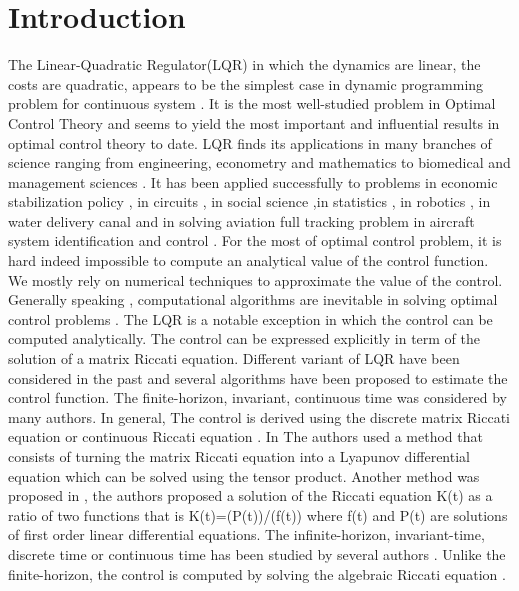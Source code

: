 \documentclass[12pt]{article}
\begin{document}
\section{\huge Introduction}
The Linear-Quadratic Regulator(LQR) in which the dynamics are linear, the costs are quadratic, appears to be the simplest case in dynamic programming problem for continuous system \cite{Bertsekas1}\cite{Todorov} \cite{Bellman}.  It is the most well-studied problem in Optimal Control Theory and  seems to yield   the most important  and influential  results in optimal control theory to date. 
LQR finds its applications in many branches of science ranging from engineering, econometry \cite{MAHMOUD} and mathematics   to biomedical \cite{Irma} and management sciences \cite{Tung}. It has been applied successfully  to problems  in economic stabilization policy \cite{Pindyck}, in  circuits \cite{Rajakumar}, in social science \cite{Cole},in  statistics \cite{Izumi}, in robotics \cite{Sairoel}  , in water delivery canal  \cite{Lemo} and in solving aviation full tracking problem in aircraft system identification and control \cite{Dul} .
For the most of   optimal control problem, it is hard  indeed impossible   to compute an analytical value of the control function. We mostly rely on numerical techniques to approximate the value of the control. Generally speaking , computational algorithms are inevitable in solving optimal control problems . 
 The   LQR  is a notable exception  in which the control  can be computed  analytically. The control can be expressed explicitly  in   term  of the solution of a matrix Riccati equation. 
Different variant of LQR have been considered in the past and several algorithms have been proposed to estimate the control function.
The finite-horizon, invariant, continuous time  was considered by many authors. In general, The control is derived using the discrete matrix Riccati equation or continuous Riccati equation \cite{Reid}\cite{Riccati}. In \cite{Nazarzadeh}  The authors used   a method that consists of turning  the matrix Riccati equation into a  Lyapunov differential equation which can be solved using the tensor product.
Another method was proposed in \cite {Lovren} , the authors proposed a solution of the Riccati equation K(t) as a ratio of two functions that is K(t)=(P(t))/(f(t)) where f(t) and P(t) are solutions of first order  linear differential equations.
The infinite-horizon, invariant-time, discrete time or continuous time  has been studied by several  authors . Unlike the finite-horizon, the control is computed by solving the algebraic Riccati equation \cite{Douglas}  \cite{Huang} 
\cite{Weiping}.
\end{document}
